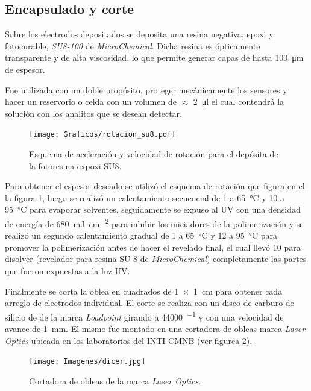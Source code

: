	\subsection{Encapsulado y corte}\label{sec:corte}

		Sobre los electrodos depositados se deposita una resina negativa, epoxi y fotocurable, \textit{SU8-100} de \textit{MicroChemical}\cite{MicrochemicalsTeam2009}. Dicha resina es ópticamente transparente y de alta viscosidad, lo que permite generar capas de hasta \SI{100}{\um} de espesor. 

		Fue utilizada con un doble propósito, proteger mecánicamente los sensores y hacer un reservorio o celda con un volumen de $\approx$ \SI{2}{\ul} el cual contendrá la solución con los analitos que se desean detectar.  
			\begin{figure}[ht]
			 		  \begin{center}
			 		  \texttt{[image: Graficos/rotacion\_su8.pdf]}
			 		  \caption[Parámetros de depósito para la resina expoxi]{Esquema de aceleración y velocidad de rotación para el depósita de la fotoresina expoxi SU8.}
			 		  \label{fig:spin-su8}
			 		  \end{center}
			 		  \end{figure}
	
		Para obtener el espesor deseado se utilizó el esquema de rotación que figura en el la figura \ref{fig:spin-su8}, luego se realizó un calentamiento secuencial de \SI{1}{\min} a \SI{65}{\celsius} y \SI{10}{\min} a \SI{95}{\celsius} para evaporar solventes, seguidamente se expuso al UV con una densidad de energía de \SI{680}{mJ.cm^{-2}} para inhibir los iniciadores de la polimerización y se realizó un segundo calentamiento gradual de \SI{1}{\min} a \SI{65}{\celsius} y \SI{12}{\min} a \SI{95}{\celsius} para promover la polimerización antes de hacer el revelado final, el cual llevó \SI{10}{\min} para disolver (revelador para resina SU-8 de \textit{MicroChemical}) completamente las partes que fueron expuestas a la luz UV. 
		
		Finalmente se corta la oblea en cuadrados de \SI{1x1}{\cm} para obtener cada arreglo de electrodos individual. El corte se realiza con un disco de carburo de silicio de  de la marca \textit{Loadpoint} girando a \SI{44000}{\min^{-1}} y con una velocidad de avance de \SI{1}{\mm}. El mismo fue montado en una cortadora de obleas marca \textit{Laser Optics} ubicada en los laboratorios del INTI-CMNB (ver figurea \ref{fig:dicer}).
			\begin{figure}[ht]
			 		  \begin{center}
			 		  \texttt{[image: Imagenes/dicer.jpg]}
			 		  \caption[Cortadora de obleas]{Cortadora de obleas de la marca \textit{Laser Optics}.}
			 		  \label{fig:dicer}
			 		  \end{center}
			 		  \end{figure}

